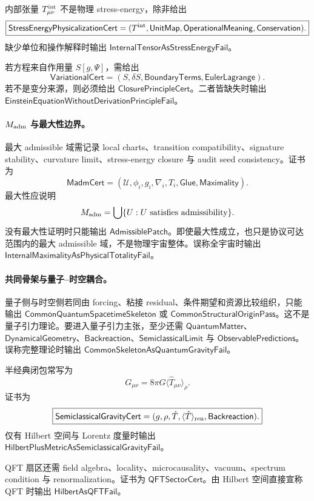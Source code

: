 内部张量 \(T^{\rm int}_{\mu\nu}\) 不是物理 stress-energy，除非给出
\[
\boxed{\mathsf{StressEnergyPhysicalizationCert}=(T^{\rm int},\mathsf{UnitMap},\mathsf{OperationalMeaning},\mathsf{Conservation}).}
\]
缺少单位和操作解释时输出 \(\mathsf{InternalTensorAsStressEnergyFail}\)。

若方程来自作用量 \(S[g,\Psi]\)，需给出
\[
\boxed{\mathsf{VariationalCert}=(S,\delta S,\mathsf{BoundaryTerms},\mathsf{EulerLagrange}).}
\]
若不是变分来源，则必须给出 \(\mathsf{ClosurePrincipleCert}\)。二者皆缺失时输出 \(\mathsf{EinsteinEquationWithoutDerivationPrincipleFail}\)。

\paragraph{\(M_{\rm adm}\) 与最大性边界。}
最大 admissible 域需记录 local charts、transition compatibility、signature stability、curvature limit、stress-energy closure 与 audit seed consistency。证书为
\[
\boxed{\mathsf{MadmCert}=(\mathcal U,\phi_i,g_i,\nabla_i,T_i,\mathsf{Glue},\mathsf{Maximality}).}
\]
最大性应说明
\[
M_{\rm adm}=\bigcup\{U:U\text{ satisfies admissibility}\}.
\]
没有最大性证明时只能输出 \(\mathsf{AdmissiblePatch}\)。即使最大性成立，也只是协议可达范围内的最大 admissible 域，不是物理宇宙整体。误称全宇宙时输出 \(\mathsf{InternalMaximalityAsPhysicalTotalityFail}\)。

\paragraph{共同骨架与量子--时空耦合。}
量子侧与时空侧若同由 forcing、粘接 residual、条件期望和资源比较组织，只能输出 \(\mathsf{CommonQuantumSpacetimeSkeleton}\) 或 \(\mathsf{CommonStructuralOriginPass}\)。这不是量子引力理论。要进入量子引力主张，至少还需 \(\mathsf{QuantumMatter}\)、\(\mathsf{DynamicalGeometry}\)、\(\mathsf{Backreaction}\)、\(\mathsf{SemiclassicalLimit}\) 与 \(\mathsf{ObservablePredictions}\)。误称完整理论时输出 \(\mathsf{CommonSkeletonAsQuantumGravityFail}\)。

半经典闭包常写为
\[
G_{\mu\nu}=8\pi G\langle\hat T_{\mu\nu}\rangle_\rho.
\]
证书为
\[
\boxed{\mathsf{SemiclassicalGravityCert}=(g,\rho,\hat T,\langle\hat T\rangle_{\rm ren},\mathsf{Backreaction}).}
\]
仅有 Hilbert 空间与 Lorentz 度量时输出 \(\mathsf{HilbertPlusMetricAsSemiclassicalGravityFail}\)。

QFT 扇区还需 field algebra、locality、microcausality、vacuum、spectrum condition 与 renormalization。证书为 \(\mathsf{QFTSectorCert}\)。由 Hilbert 空间直接宣称 QFT 时输出 \(\mathsf{HilbertAsQFTFail}\)。

